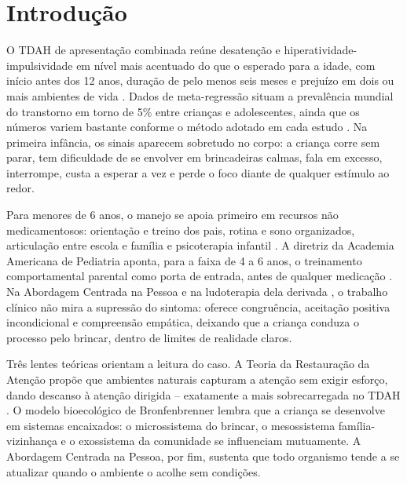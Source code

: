 \section{Introdu\c{c}\~ao}

O TDAH de apresenta\c{c}\~ao combinada re\'une desaten\c{c}\~ao e hiperatividade-impulsividade em n\'ivel mais acentuado do que o esperado para a idade, com in\'icio antes dos 12 anos, dura\c{c}\~ao de pelo menos seis meses e preju\'izo em dois ou mais ambientes de vida \cite{apa2023}. Dados de meta-regress\~ao situam a preval\^encia mundial do transtorno em torno de 5\% entre crian\c{c}as e adolescentes, ainda que os n\'umeros variem bastante conforme o m\'etodo adotado em cada estudo \cite{polanczyk2007}. Na primeira inf\^ancia, os sinais aparecem sobretudo no corpo: a crian\c{c}a corre sem parar, tem dificuldade de se envolver em brincadeiras calmas, fala em excesso, interrompe, custa a esperar a vez e perde o foco diante de qualquer est\'imulo ao redor.

Para menores de 6 anos, o manejo se apoia primeiro em recursos n\~ao medicamentosos: orienta\c{c}\~ao e treino dos pais, rotina e sono organizados, articula\c{c}\~ao entre escola e fam\'ilia e psicoterapia infantil \cite{hood2024}. A diretriz da Academia Americana de Pediatria aponta, para a faixa de 4 a 6 anos, o treinamento comportamental parental como porta de entrada, antes de qualquer medica\c{c}\~ao \cite{aap2019}. Na Abordagem Centrada na Pessoa \cite{rogers2020} e na ludoterapia dela derivada \cite{axline1984}, o trabalho cl\'inico n\~ao mira a supress\~ao do sintoma: oferece congru\^encia, aceita\c{c}\~ao positiva incondicional e compreens\~ao emp\'atica, deixando que a crian\c{c}a conduza o processo pelo brincar, dentro de limites de realidade claros.

Tr\^es lentes te\'oricas orientam a leitura do caso. A Teoria da Restaura\c{c}\~ao da Aten\c{c}\~ao prop\~oe que ambientes naturais capturam a aten\c{c}\~ao sem exigir esfor\c{c}o, dando descanso \`a aten\c{c}\~ao dirigida -- exatamente a mais sobrecarregada no TDAH \cite{hood2024,kuo2004}. O modelo bioecol\'ogico de Bronfenbrenner \cite{bronfenbrenner1996} lembra que a crian\c{c}a se desenvolve em sistemas encaixados: o microssistema do brincar, o mesossistema fam\'ilia-vizinhan\c{c}a e o exossistema da comunidade se influenciam mutuamente. A Abordagem Centrada na Pessoa, por fim, sustenta que todo organismo tende a se atualizar quando o ambiente o acolhe sem condi\c{c}\~oes.

